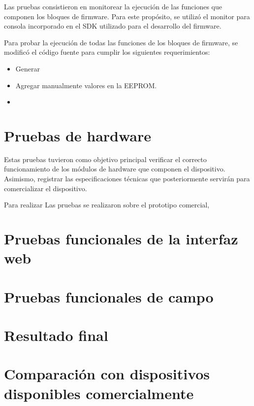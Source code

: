 Las pruebas consistieron en monitorear la ejecución de las funciones que componen los bloques de firmware. Para este propósito, se utilizó el monitor para consola incorporado en el SDK utilizado para el desarrollo del firmware.

Para probar la ejecución de todas las funciones de los bloques de firmware, se modificó el código fuente para cumplir los siguientes requerimientos:

\begin{itemize}
	\item Generar 
	\item Agregar manualmente valores en la EEPROM.
	\item 
\end{itemize}




\section{Pruebas de hardware}
\label{sec:pruebasHW}

Estas pruebas tuvieron como objetivo principal verificar el correcto funcionamiento de los módulos de hardware que componen el dispositivo. Asimismo, registrar las especificaciones técnicas que posteriormente servirán para comercializar el dispositivo.

Para realizar  Las pruebas se realizaron sobre el prototipo comercial, 


\section{Pruebas funcionales de la interfaz web}
\label{sec:pruebasWI}


\section{Pruebas funcionales de campo}
\label{sec:pruebasWI}


\section{Resultado final}
\label{sec:resultadoF}


\section{Comparación con dispositivos disponibles comercialmente}
\label{sec:comparacionDDC}

